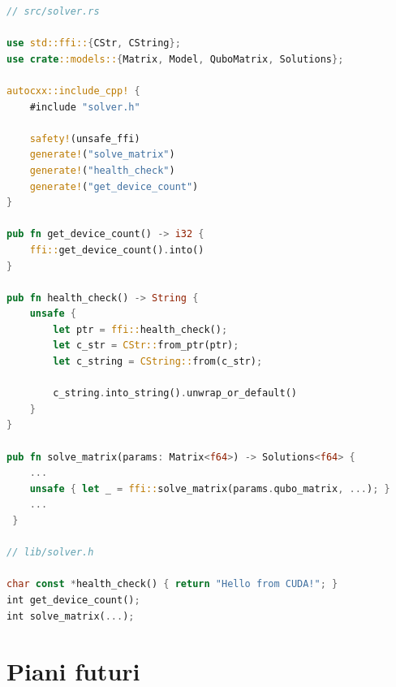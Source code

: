 \vspace{5mm}
\begin{lstlisting}[language=Rust, caption=Macro autocxx e uso della FFI, label=lis:generic_glsl]
// src/solver.rs

use std::ffi::{CStr, CString};
use crate::models::{Matrix, Model, QuboMatrix, Solutions};

autocxx::include_cpp! {
    #include "solver.h"

    safety!(unsafe_ffi)
    generate!("solve_matrix")
    generate!("health_check")
    generate!("get_device_count")
}
    
pub fn get_device_count() -> i32 {
    ffi::get_device_count().into()
}

pub fn health_check() -> String {
    unsafe {
        let ptr = ffi::health_check();
        let c_str = CStr::from_ptr(ptr);
        let c_string = CString::from(c_str);

        c_string.into_string().unwrap_or_default()
    }
}

pub fn solve_matrix(params: Matrix<f64>) -> Solutions<f64> { 
    ...
    unsafe { let _ = ffi::solve_matrix(params.qubo_matrix, ...); }
    ...
 }

// lib/solver.h

char const *health_check() { return "Hello from CUDA!"; }
int get_device_count();
int solve_matrix(...);
\end{lstlisting}
\vspace{5mm}





\section{Piani futuri}

